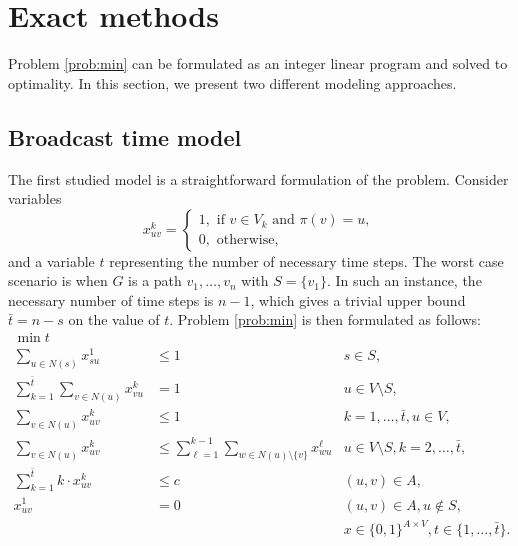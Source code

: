 \section{Exact methods}

Problem \ref{prob:min} can be formulated as an integer linear program and solved to optimality. In this section, we present two different modeling approaches. 

\subsection{Broadcast time model}
The first studied model is a straightforward formulation of the problem.
Consider variables 
$$ x_{uv}^k=
\begin{cases} 
1, \text{ if } v\in V_k \text{ and } \pi(v)=u,\\ 
0, \text{ otherwise},
\end{cases}
$$
and a variable $t$ representing the number of necessary time steps.
The worst case scenario is when $G$ is a path $v_1,\dots,v_n$ with $S=\{v_1\}$. 
In such an instance, the necessary number of time steps is $n-1$, which gives a trivial upper bound $\bar{t}=n-s$ on the value of $t$.
Problem \ref{prob:min} is then formulated as follows: 
\begin{subequations}\label{mod:basic}
\begin{align}
\label{mod:basic:obj} \min t \\ 
\label{mod:basic:onefromroot} \sum_{u \in N(s)}x^1_{su} & \leq 1 & s\in S,\\
\label{mod:basic:singlein} \sum\limits_{k=1}^{\bar{t}}\sum\limits_{v\in N(u)}x_{vu}^k & = 1 & u\in V \setminus S,\\
\label{mod:basic:uniqueTout} \sum\limits_{v\in N(u)}x_{uv}^k & \leq 1  & k=1,\dots,\bar{t},u\in V,\\
\label{mod:basic:tIncreases} \sum\limits_{v\in N(u)}x_{uv}^k &\leq\sum\limits_{\ell=1}^{k-1}\sum\limits_{w\in N(u)\setminus\{v\}} x_{wu}^{\ell}  & u\in V\setminus S, k=2,\dots,\bar{t},\\
\label{mod:basic:tcrel} \sum\limits_{k=1}^{\bar{t}}k\cdot x_{uv}^k & \leq c &  (u,v)\in A,\\
\label{mod:basic:positiveCost}x_{uv}^1 & = 0 & (u,v)\in A, u \not\in S,\\
\label{mod:basic:dim}&&x \in \{0,1\}^{A\times V},t\in\{1,\dots,\bar{t}\}.
\end{align}~
\end{subequations}
